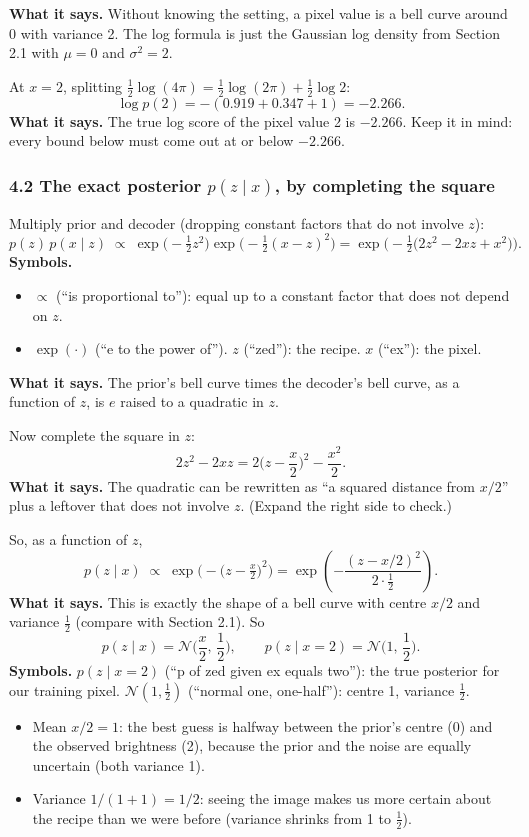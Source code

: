 \textbf{What it says.} Without knowing the setting, a pixel value is a bell curve around 0 with variance 2. The log formula is just the Gaussian log density from Section 2.1 with $\mu = 0$ and $\sigma^2 = 2$.

At $x = 2$, splitting $\tfrac{1}{2}\log(4\pi) = \tfrac{1}{2}\log(2\pi) + \tfrac{1}{2}\log 2$:
\[
\log p(2) = -(0.919 + 0.347 + 1) = -2.266.
\]
\textbf{What it says.} The true log score of the pixel value 2 is $-2.266$. Keep it in mind: every bound below must come out at or below $-2.266$.

\subsubsection*{4.2 The exact posterior $p(z \mid x)$, by completing the square}

Multiply prior and decoder (dropping constant factors that do not involve $z$):
\[
p(z)\,p(x \mid z) \;\propto\; \exp\!\Big(-\tfrac{1}{2}z^2\Big)\exp\!\Big(-\tfrac{1}{2}(x - z)^2\Big)
= \exp\!\Big(-\tfrac{1}{2}\big(2z^2 - 2xz + x^2\big)\Big).
\]
\textbf{Symbols.}
\begin{itemize}[leftmargin=1.5em, itemsep=0pt]
\item $\propto$ (``is proportional to''): equal up to a constant factor that does not depend on $z$.
\item $\exp(\cdot)$ (``e to the power of''). $z$ (``zed''): the recipe. $x$ (``ex''): the pixel.
\end{itemize}
\textbf{What it says.} The prior's bell curve times the decoder's bell curve, as a function of $z$, is $e$ raised to a quadratic in $z$.

Now complete the square in $z$:
\[
2z^2 - 2xz = 2\Big(z - \frac{x}{2}\Big)^2 - \frac{x^2}{2}.
\]
\textbf{What it says.} The quadratic can be rewritten as ``a squared distance from $x/2$'' plus a leftover that does not involve $z$. (Expand the right side to check.)

So, as a function of $z$,
\[
p(z \mid x) \;\propto\; \exp\!\Big(-\big(z - \tfrac{x}{2}\big)^2\Big) = \exp\!\left(-\frac{(z - x/2)^2}{2 \cdot \tfrac{1}{2}}\right).
\]
\textbf{What it says.} This is exactly the shape of a bell curve with centre $x/2$ and variance $\tfrac{1}{2}$ (compare with Section 2.1). So
\[
p(z \mid x) = \mathcal{N}\Big(\frac{x}{2},\, \frac{1}{2}\Big), \qquad p(z \mid x = 2) = \mathcal{N}\Big(1,\, \frac{1}{2}\Big).
\]
\textbf{Symbols.} $p(z \mid x = 2)$ (``p of zed given ex equals two''): the true posterior for our training pixel. $\mathcal{N}(1, \tfrac12)$ (``normal one, one-half''): centre 1, variance $\tfrac12$.
\begin{itemize}[leftmargin=1.5em]
\item Mean $x/2 = 1$: the best guess is halfway between the prior's centre (0) and the observed brightness (2), because the prior and the noise are equally uncertain (both variance 1).
\item Variance $1/(1+1) = 1/2$: seeing the image makes us more certain about the recipe than we were before (variance shrinks from 1 to $\tfrac12$).
\end{itemize}

